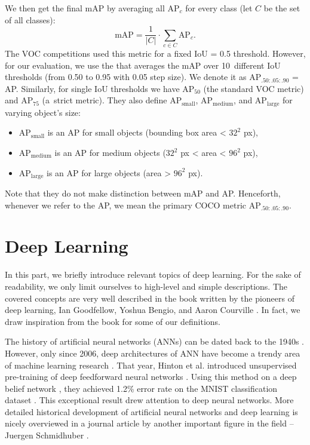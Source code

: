 We then get the final mAP by averaging all AP$_c$ for every class (let $C$ be
the set of all classes):
$$
    \text{mAP} = \frac{1}{\lvert C \rvert} \cdot \sum_{ c\in C} \text{AP}_c.
$$
The VOC competitions \cite{voc} used this metric for a fixed IoU = 0.5 threshold.
However, for our evaluation, we use the 
\cite{coco} that averages the mAP over 10~different IoU thresholds (from 0.50
to 0.95 with 0.05 step size). We denote it as AP$_{.50:.05:.90}$ = AP.
Similarly, for single IoU thresholds we have AP$_{50}$ (the standard VOC metric)
and AP$_{75}$ (a~strict metric). They also define AP$_\text{small}$,
AP$_\text{medium}$, and AP$_\text{large}$ for varying object's size:
\begin{itemize}
    \item AP$_\text{small}$ is an AP for small objects (bounding box area <
          $32^2$ px),
    \item AP$_\text{medium}$ is an AP for medium objects ($32^2$ px < area <
          $96^2$ px),
    \item AP$_\text{large}$ is an AP for large objects (area > $96^2$ px).
\end{itemize}
Note that they do not make distinction between mAP and AP. Henceforth, whenever
we refer to the AP, we mean the primary COCO metric AP$_{.50:.05:.90}$.

\section{Deep Learning}\label{deep_learning_chapter}
In this part, we briefly introduce relevant topics of deep learning. For the
sake of readability, we only limit ourselves to high-level and simple
descriptions. The covered concepts are very well described in the book written
by the pioneers of deep learning, Ian Goodfellow, Yoshua Bengio, and Aaron
Courville \cite{Goodfellow-et-al-2016}. In fact, we draw inspiration from the
book for some of our definitions.

The history of artificial neural networks (ANNs) can be dated back to the 1940s
\cite{McCulloch_1943}. However, only since 2006, deep architectures of ANN have
become a trendy area of machine learning research
\cite{DBLP:journals/corr/Schmidhuber14}. That year, Hinton et al. introduced
unsupervised pre-training of deep feedforward neural networks
\cite{hinton2006reducing}. Using this method on a deep belief network
\cite{DBN}, they achieved 1.2\% error rate on the MNIST classification
dataset \cite{hinton2006fast, mnist}. This exceptional result drew attention
to deep neural networks. More detailed historical development of artificial
neural networks and deep learning is nicely overviewed in a journal article by
another important figure in the field -- Juergen Schmidhuber
\cite{DBLP:journals/corr/Schmidhuber14}.

